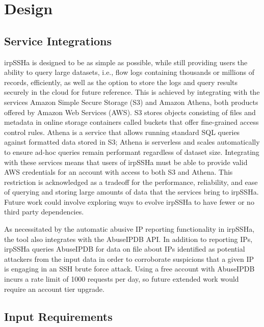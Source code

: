\section{Design}
\subsection{Service Integrations}

irpSSHa is designed to be as simple as possible, while still providing users the ability to query large datasets, i.e., flow logs containing thousands or millions of records, efficiently, as well as the option to store the logs and query results securely in the cloud for future reference. This is achieved by integrating with the services Amazon Simple Secure Storage (S3) and Amazon Athena, both products offered by Amazon Web Services (AWS). S3 stores objects consisting of files and metadata in online storage containers called buckets that offer fine-grained access control rules. Athena is a service that allows running standard SQL queries against formatted data stored in S3; Athena is serverless and scales automatically to ensure ad-hoc queries remain performant regardless of dataset size. Integrating with these services means that users of irpSSHa must be able to provide valid AWS credentials for an account with access to both S3 and Athena. This restriction is acknowledged as a tradeoff for the performance, reliability, and ease of querying and storing large amounts of data that the services bring to irpSSHa. Future work could involve exploring ways to evolve irpSSHa to have fewer or no third party dependencies.

As necessitated by the automatic abusive IP reporting functionality in irpSSHa, the tool also integrates with the AbuseIPDB API. In addition to reporting IPs, irpSSHa queries AbuseIPDB for data on file about IPs identified as potential attackers from the input data in order to corroborate suspicions that a given IP is engaging in an SSH brute force attack. Using a free account with AbuseIPDB incurs a rate limit of 1000 requests per day, so future extended work would require an account tier upgrade.

\subsection{Input Requirements}

